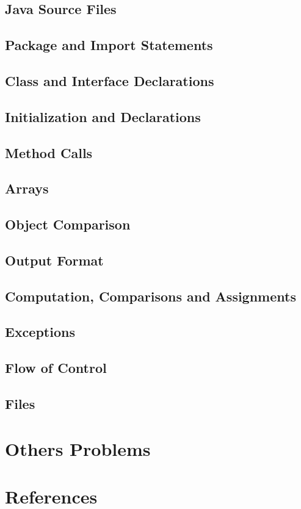 \documentclass[a4paper]{article}
\begin{document}
\subsection{Java Source Files}
\subsection{Package and Import Statements}
\subsection{Class and Interface Declarations}
\subsection{Initialization and Declarations}
\subsection{Method Calls}
\subsection{Arrays}
\subsection{Object Comparison}
\subsection{Output Format}
\subsection{Computation, Comparisons and Assignments}
\subsection{Exceptions}
\subsection{Flow of Control}
\subsection{Files}

\section{Others Problems}

\newpage
\section{References}
\end{document}
